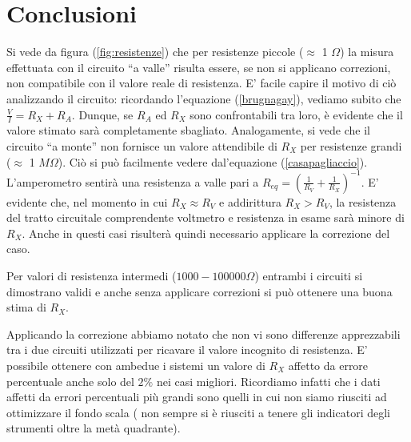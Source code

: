 \section{Conclusioni}
Si vede da figura (\ref{fig:resistenze}) che per resistenze piccole ($\approx$ 1 $\Omega$) la misura effettuata con il circuito ``a valle'' risulta essere, se non si applicano correzioni, non compatibile con il valore reale di resistenza. E' facile capire il motivo di ciò analizzando il circuito: ricordando l'equazione (\ref{brugnagay}), vediamo subito che $\frac{V}{I}=R_X+R_A$. Dunque, se $R_A$ ed $R_X$ sono confrontabili tra loro, è evidente che il valore stimato sarà completamente sbagliato. Analogamente, si vede che il circuito ``a monte'' non fornisce un valore attendibile di $R_X$ per resistenze grandi ($\approx$ 1 $M\Omega$). Ciò si può facilmente vedere dal'equazione (\ref{casapagliaccio}). L'amperometro sentirà una resistenza a valle pari a $R_{eq}=(\frac{1}{R_V}+\frac{1}{R_X})^{-1}$. E' evidente che, nel momento in cui $R_X \approx R_V$ e addirittura $R_X > R_V$, la resistenza del tratto circuitale comprendente voltmetro e resistenza in esame sarà minore di $R_X$. Anche in questi casi risulterà quindi necessario applicare la correzione del caso. 

Per valori di resistenza intermedi ($1000-100000 \Omega$) entrambi i circuiti si dimostrano validi e anche senza applicare correzioni si può ottenere una buona stima di $R_X$.

Applicando la correzione abbiamo notato che non vi sono differenze apprezzabili tra i due circuiti utilizzati per ricavare il valore incognito di resistenza. E' possibile ottenere con ambedue i sistemi un valore di $R_X$ affetto da errore percentuale anche solo del $2\%$ nei casi migliori. Ricordiamo infatti che i dati affetti da errori percentuali più grandi sono quelli in cui non siamo riusciti ad ottimizzare il fondo scala ( non sempre si è riusciti a tenere gli indicatori degli strumenti oltre la metà quadrante). %


